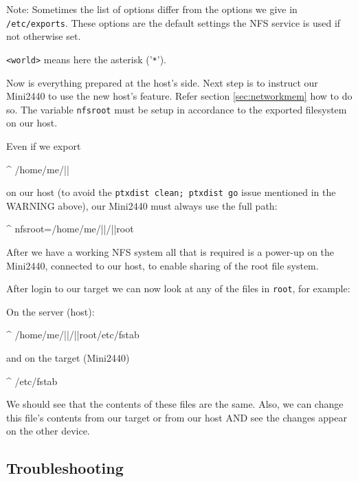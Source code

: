 Note: Sometimes the list of options differ from the options we give in
\texttt{/etc/exports}. These options are the default settings the NFS service
is used if not otherwise set.

\texttt{<world>} means here the asterisk ('\texttt{*}').

Now is everything prepared at the host's side. Next step is to instruct our
Mini2440 to use the new host's feature. Refer section \ref{sec:networkmem} how
to do so. The variable \texttt{nfsroot} must be setup in accordance to the
exported filesystem on our host.

Even if we export

\begin{ptxshell}[escapechar=|]{^}
/home/me/|\ptxdistBSPName |
\end{ptxshell}

on our host (to avoid the \texttt{ptxdist clean; ptxdist go} issue mentioned
in the WARNING above), our Mini2440 must always use the full path:

\begin{ptxshell}[escapechar=|]{^}
nfsroot=/home/me/|\ptxdistBSPName |/|\ptxdistPlatformDir |root
\end{ptxshell}

After we have a working NFS system all that is required is a power-up on the
Mini2440, connected to our host, to enable sharing of the root file system.

After login to our target we can now look at any of the files in
\texttt{\ptxdistPlatformDir root}, for example:

On the server (host):

\begin{ptxshell}[escapechar=|]{^}
/home/me/|\ptxdistBSPName |/|\ptxdistPlatformDir |root/etc/fstab
\end{ptxshell}

and on the target (Mini2440)

\begin{ptxshell}[escapechar=|]{^}
/etc/fstab
\end{ptxshell}

We should see that the contents of these files are the same. Also, we can
change this file’s contents from our target or from our host AND see the
changes appear on the other device.

\subsection{Troubleshooting}

